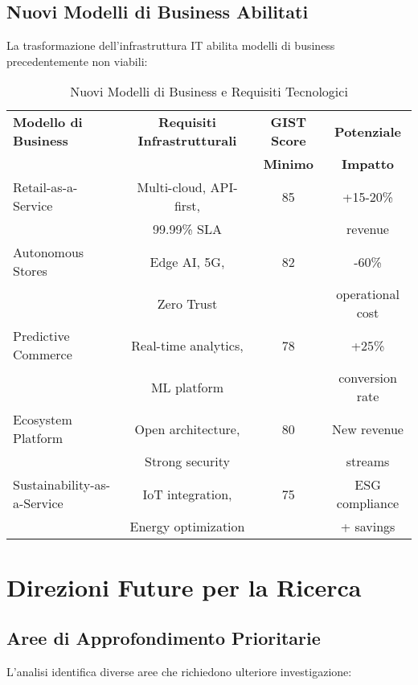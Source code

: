 \subsection{Nuovi Modelli di Business Abilitati}

La trasformazione dell'infrastruttura IT abilita modelli di business precedentemente non viabili:

\begin{table}[H]
\centering
\begin{tabular}{lccc}
\toprule
\textbf{Modello di Business} & \textbf{Requisiti Infrastrutturali} & \textbf{GIST Score} & \textbf{Potenziale} \\
 & & \textbf{Minimo} & \textbf{Impatto} \\
\midrule
Retail-as-a-Service & Multi-cloud, API-first, & 85 & +15-20\% \\
 & 99.99\% SLA & & revenue \\
\midrule
Autonomous Stores & Edge AI, 5G, & 82 & -60\% \\
 & Zero Trust & & operational cost \\
\midrule
Predictive Commerce & Real-time analytics, & 78 & +25\% \\
 & ML platform & & conversion rate \\
\midrule
Ecosystem Platform & Open architecture, & 80 & New revenue \\
 & Strong security & & streams \\
\midrule
Sustainability-as-a-Service & IoT integration, & 75 & ESG compliance \\
 & Energy optimization & & + savings \\
\bottomrule
\end{tabular}
\caption{Nuovi Modelli di Business e Requisiti Tecnologici}
\end{table}

\section{Direzioni Future per la Ricerca}

\subsection{Aree di Approfondimento Prioritarie}

L'analisi identifica diverse aree che richiedono ulteriore investigazione:

